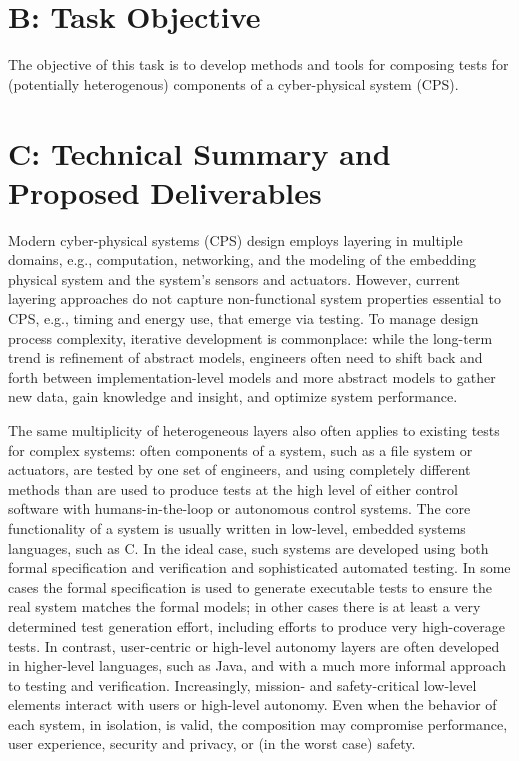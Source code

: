 \documentclass[12pt]{article}
\newcommand{\mycomment}[1]{}
\begin{document}
\newpage
{}
\section{B:  Task Objective}

The objective of this task is to develop methods and tools for composing tests for
(potentially heterogenous) components of a cyber-physical system
(CPS). \mycomment{
Composition of existing tests enhances the utility of formal
verification, automated testing, and manual testing driven by systems
engineers, human interface experts, or quality-assurance experts.
Composition of tests also provides a novel test generation method that
can detect previously un-detected faults arising from interactions of
system components tested using disparate methods.}

\section{C: Technical Summary and Proposed Deliverables}

Modern cyber-physical systems (CPS) design employs layering in multiple domains, e.g., computation, networking, and the modeling of the embedding physical system and the system's sensors and actuators. However, current layering approaches do not capture non-functional system properties essential to CPS, e.g., timing and energy use, that emerge via testing.  To manage design process complexity, iterative development is commonplace: while the long-term trend is refinement of abstract models, engineers often need to shift back and forth between implementation-level models and more abstract models to gather new data, gain knowledge and insight, and optimize system performance.

The same multiplicity of heterogeneous layers also often applies to existing tests for complex systems: often components of a system, such as a file system or actuators, are tested by one set of engineers, and using completely different methods than are used to produce tests at the high level of either control software with humans-in-the-loop or autonomous control systems.  The core functionality of a system is usually written in low-level, embedded systems languages, such as C.  In the ideal case, such systems are developed using both formal specification and verification and sophisticated automated testing.  In some cases the formal specification is used to generate executable tests to ensure the real system matches the formal models; in other cases there is at least a very determined test generation effort, including efforts to produce very high-coverage tests.  In contrast, user-centric or high-level autonomy layers are often developed in higher-level languages, such as Java, and with a much more informal approach to testing and verification.  Increasingly, mission- and safety-critical low-level elements interact with users or high-level autonomy.  Even when the behavior of each system, in isolation, is valid, the composition may compromise performance, user experience, security and privacy, or (in the worst case) safety.
\end{document}
